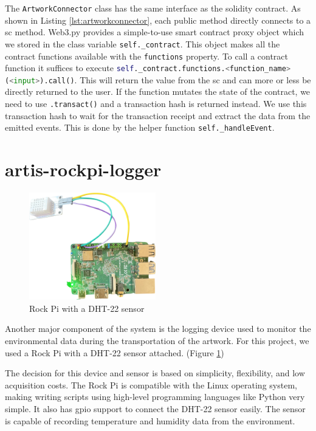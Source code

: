 The \texttt{ArtworkConnector} class has the same interface as the solidity contract. As shown in Listing \ref{lst:artworkconnector}, each public method directly connects to a \gls{sc} method. Web3.py provides a simple-to-use smart contract proxy object which we stored in the class variable \texttt{self.\_contract}. This object makes all the contract functions available with the \texttt{functions} property. To call a contract function it suffices to execute \lstinline[language=Python]!self._contract.functions.<function_name>(<input>).call()!.
This will return the value from the \gls{sc} and can more or less be directly returned to the user. If the function mutates the state of the contract, we need to use \lstinline[language=Python]!.transact()! and a transaction hash is returned instead. We use this transaction hash to wait for the transaction receipt and extract the data from the emitted events. This is done by the helper function \texttt{self.\_handleEvent}.



\clearpage
\section{artis-rockpi-logger}
\begin{figure}[h]
    \centering
    \includegraphics[width=0.49\textwidth]{resources/rock-pi.png}
    \caption{Rock Pi with a DHT-22 sensor} 
    \label{fig:rock-pi}
\end{figure}
Another major component of the system is the logging device used to monitor the environmental data during the transportation of the artwork. For this project, we used a Rock Pi \cite{rockpi4} with a DHT-22 \cite{dht22} sensor attached. (Figure \ref{fig:rock-pi})

The decision for this device and sensor is based on simplicity, flexibility, and low acquisition costs. The Rock Pi is compatible with the Linux operating system, making writing scripts using high-level programming languages like Python very simple. It also has \gls{gpio} support to connect the DHT-22 sensor easily. The sensor is capable of recording temperature and humidity data from the environment.

